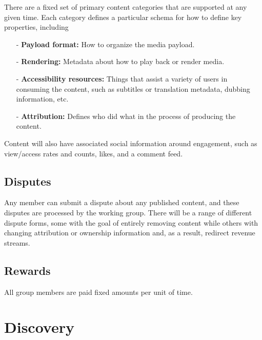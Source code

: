 \documentclass{article}
\begin{document}
There are a fixed set of primary content categories that are supported at any given time. Each category defines a particular schema for how to define key properties, including

\begin{itemize}

    \item[-] \textbf{Payload format:} How to organize the media payload.

    \item[-] \textbf{Rendering:} Metadata about how to play back or render media.

    \item[-] \textbf{Accessibility resources:} Things that assist a variety of users in consuming the content, such as subtitles or translation metadata, dubbing information, etc.

    \item[-] \textbf{Attribution:} Defines who did what in the process of producing the content.

\end{itemize}

Content will also have associated social information around engagement, such as view/access rates and counts, likes, and a comment feed.

\subsection{Disputes}

Any member can submit a dispute about any published content, and these disputes are processed by the working group. There will be a range of different dispute forms, some with the goal of entirely removing content while others with changing attribution or ownership information and, as a result, redirect revenue streams.


\subsection{Rewards}

All group members are paid fixed amounts per unit of time.

\section{Discovery}
\end{document}
